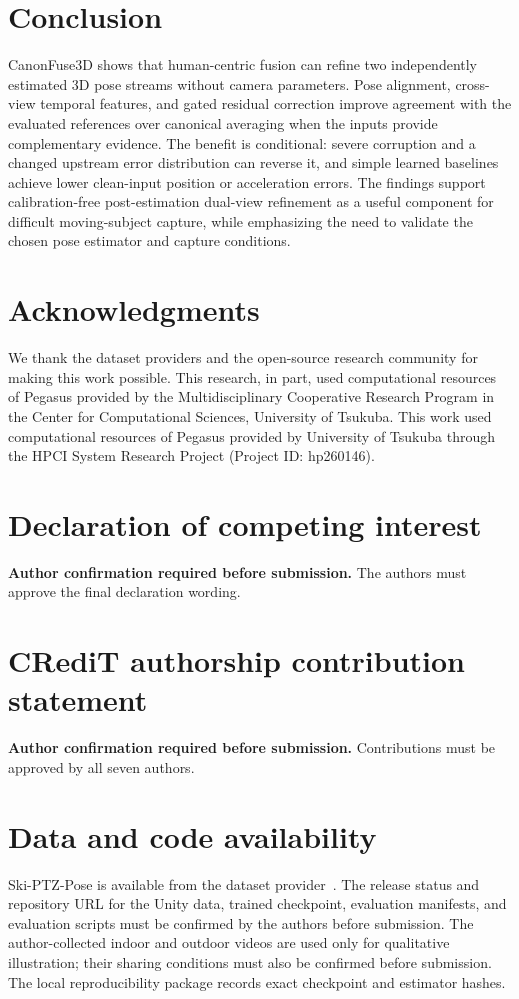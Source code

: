 \documentclass[preprint,12pt]{elsarticle}
\begin{document}
\section{Conclusion}
\label{sec:conclusion}

CanonFuse3D shows that human-centric fusion can refine two independently estimated 3D pose streams without camera parameters. Pose alignment, cross-view temporal features, and gated residual correction improve agreement with the evaluated references over canonical averaging when the inputs provide complementary evidence. The benefit is conditional: severe corruption and a changed upstream error distribution can reverse it, and simple learned baselines achieve lower clean-input position or acceleration errors. The findings support calibration-free post-estimation dual-view refinement as a useful component for difficult moving-subject capture, while emphasizing the need to validate the chosen pose estimator and capture conditions.

\section*{Acknowledgments}
We thank the dataset providers and the open-source research community for making this work possible. This research, in part, used computational resources of Pegasus provided by the Multidisciplinary Cooperative Research Program in the Center for Computational Sciences, University of Tsukuba. This work used computational resources of Pegasus provided by University of Tsukuba through the HPCI System Research Project (Project ID: hp260146).

\section*{Declaration of competing interest}
\textbf{Author confirmation required before submission.} The authors must approve the final declaration wording.

\section*{CRediT authorship contribution statement}
\textbf{Author confirmation required before submission.} Contributions must be approved by all seven authors.

\section*{Data and code availability}
Ski-PTZ-Pose is available from the dataset provider~\cite{ski_poseptz_dataset}. The release status and repository URL for the Unity data, trained checkpoint, evaluation manifests, and evaluation scripts must be confirmed by the authors before submission. The author-collected indoor and outdoor videos are used only for qualitative illustration; their sharing conditions must also be confirmed before submission. The local reproducibility package records exact checkpoint and estimator hashes.
\end{document}

